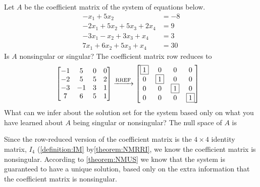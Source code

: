 \documentclass{ximera}
\author{Rob Beezer}
\begin{document}
\begin{exercise}
  Let $A$ be the coefficient matrix of the system of equations below.
  \begin{align*}
    -x_1+5x_2&=-8\\
    -2x_1+5x_2+5x_3+2x_4&=9\\
    -3x_1-x_2+3x_3+x_4&=3\\
    7x_1+6x_2+5x_3+x_4&=30
  \end{align*}
  Is $A$ nonsingular or singular?
  The coefficient matrix row reduces to
  \begin{align*}
    \begin{bmatrix}
      -1 & 5 & 0 & 0  \\
      -2 & 5 & 5 & 2  \\
      -3 & -1 & 3 & 1  \\
      7 & 6 & 5 & 1
    \end{bmatrix}
         &\xrightarrow{\text{RREF}}
           \begin{bmatrix}
             \fbox{1} & 0 & 0 & 0  \\
             0 & \fbox{1} & 0 & 0  \\
             0 & 0 & \fbox{1} & 0  \\
             0 & 0 & 0 & \fbox{1}
           \end{bmatrix}
  \end{align*}
  What can we infer about the solution set for the system based only on what you have learned about $A$ being singular or nonsingular?  The null space of $A$ is
  \begin{multipleChoice}
  \end{multipleChoice}

  \begin{feedback}[correct]
    Since the row-reduced version of the coefficient matrix is the
    $4\times 4$ identity matrix, $I_4$ (\ref{definition:IM}
    by\ref{theorem:NMRRI}, we know the coefficient matrix is
    nonsingular.  According to \ref{theorem:NMUS} we know that the
    system is guaranteed to have a unique solution, based only on the
    extra information that the coefficient matrix is nonsingular.
  \end{feedback}
\end{exercise}
\end{document}
